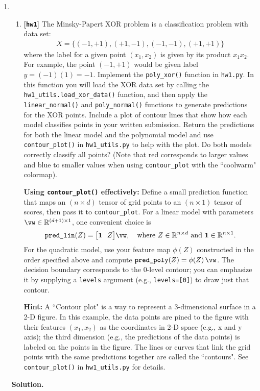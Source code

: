 \documentclass{article}
\def\R{\mathbb{R}}
\def\hw{\textbf{[\texttt{hw1}]}\xspace}
\theoremstyle{definition}
\theoremstyle{remark}
\newenvironment{Q}
{%
  \clearpage
  \item
  }
  {%
    \phantom{s} %
    \bigskip
    \textbf{Solution.}
  }
\begin{document}
\begin{enumerate}[font={\Large\bfseries},left=0pt]
\begin{Q}
\begin{enumerate}
 \item \hw The Minsky-Papert XOR problem is a classification problem with data set: \begin{align*}
  X = \{(-1,+1), (+1,-1), (-1,-1),(+1,+1)\}
\end{align*}
where the label for a given point $(x_1,x_2)$ is given by its product $x_1x_2$.  For example, the point $(-1,+1)$ would be given label $y = (-1)(1) = -1$.  Implement the \texttt{poly\_xor()} function in \texttt{hw1.py}.  In this function you will load the XOR data set by calling the \texttt{hw1\_utils.load\_xor\_data()} function, and then apply the \texttt{linear\_normal()} and \texttt{poly\_normal()} functions to generate predictions for the XOR points. Include a plot of contour lines that show how each model classifies points in your written submission. Return the predictions for both the linear model and the polynomial model and use \texttt{contour\_plot()} in \texttt{hw1\_utils.py} to help with the plot. Do both models correctly classify all points? (Note that red corresponds to larger values and blue to smaller values when using \texttt{contour\_plot} with the ``coolwarm" colormap).

\textbf{Using \texttt{contour\_plot()} effectively:} Define a small prediction function that maps an $(n\times d)$ tensor of grid points to an $(n\times 1)$ tensor of scores, then pass it to \texttt{contour\_plot}. For a linear model with parameters $\vw\in\R^{(d+1)\times 1}$, one convenient choice is
\[
\texttt{pred\_lin}(Z) = \bigl[\mathbf{1}\ \ Z\bigr] \vw,\quad \text{where } Z\in\R^{n\times d} \text{ and } \mathbf{1}\in\R^{n\times 1}.
\]
For the quadratic model, use your feature map $\phi(Z)$ constructed in the order specified above and compute $\texttt{pred\_poly}(Z) = \phi(Z)\,\vw$. The decision boundary corresponds to the $0$-level contour; you can emphasize it by supplying a \texttt{levels} argument (e.g., \texttt{levels=[0]}) to draw just that contour.

\textbf{Hint:} A ``Contour plot" is a way to represent a 3-dimensional surface in a 2-D figure. In this example, the data points are pined to the figure with their features $(x_1, x_2)$ as the coordinates in 2-D space (e.g., x and y axis); the third dimension (e.g., the predictions of the data points) is labeled on the points in the figure. The lines or curves that link the grid points with the same predictions together are called the ``contours". See \texttt{contour\_plot()} in \texttt{hw1\_utils.py} for details.
  \end{enumerate}
  \end{Q}


\end{enumerate}
\end{document}
